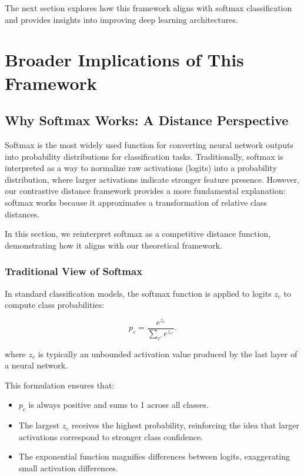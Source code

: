 \documentclass[12pt]{article}
\begin{document}
The next section explores how this framework aligns with softmax classification and provides insights into improving deep learning architectures.


\section{Broader Implications of This Framework}
\subsection{Why Softmax Works: A Distance Perspective}

Softmax is the most widely used function for converting neural network outputs into probability distributions for classification tasks. Traditionally, softmax is interpreted as a way to normalize raw activations (logits) into a probability distribution, where larger activations indicate stronger feature presence. However, our contrastive distance framework provides a more fundamental explanation: softmax works because it approximates a transformation of relative class distances.

In this section, we reinterpret softmax as a competitive distance function, demonstrating how it aligns with our theoretical framework.

\subsubsection{Traditional View of Softmax}

In standard classification models, the softmax function is applied to logits \( z_c \) to compute class probabilities:

\[
p_c = \frac{e^{z_c}}{\sum_{c'} e^{z_{c'}}}.
\]

where \( z_c \) is typically an unbounded activation value produced by the last layer of a neural network.

This formulation ensures that:

\begin{itemize}
    \item \( p_c \) is always positive and sums to 1 across all classes.
    \item The largest \( z_c \) receives the highest probability, reinforcing the idea that larger activations correspond to stronger class confidence.
    \item The exponential function magnifies differences between logits, exaggerating small activation differences.
\end{itemize}
\end{document}
